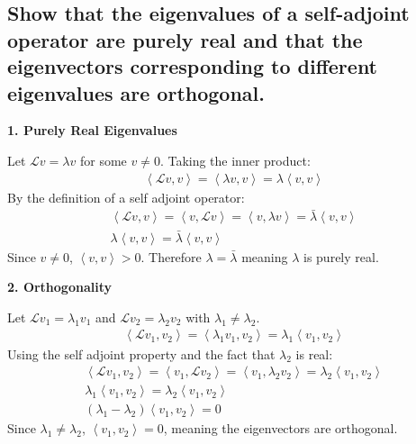 \documentclass[11pt]{article}
\begin{document}
    \subsection{Show that the eigenvalues of a self-adjoint operator are purely real and that the eigenvectors corresponding to different eigenvalues are orthogonal.}

    \textbf{1. Purely Real Eigenvalues}

    Let $\mathcal{L}v = \lambda v$ for some $v \neq 0$. Taking the inner product:
    \begin{gather*}
        \left<\mathcal{L}v,v\right> = \left<\lambda v,v\right> = \lambda \left<v,v\right>
    \end{gather*}
    By the definition of a self adjoint operator:
    \begin{gather*}
        \left<\mathcal{L}v,v\right> = \left<v,\mathcal{L}v\right> = \left<v,\lambda v\right> = \bar{\lambda} \left<v,v\right>\\
        \lambda \left<v,v\right> = \bar{\lambda} \left<v,v\right>
    \end{gather*}
    Since $v \neq 0$, $\left<v,v\right> > 0$. Therefore $\lambda = \bar{\lambda}$ meaning $\lambda$ is purely real.

    \textbf{2. Orthogonality}

    Let $\mathcal{L}v_1 = \lambda_1 v_1$ and $\mathcal{L}v_2 = \lambda_2 v_2$ with $\lambda_1 \neq \lambda_2$.
    \begin{gather*}
        \left<\mathcal{L}v_1,v_2\right> = \left<\lambda_1 v_1, v_2\right> = \lambda_1 \left<v_1, v_2\right>
    \end{gather*}
    Using the self adjoint property and the fact that $\lambda_2$ is real:
    \begin{gather*}
        \left<\mathcal{L}v_1,v_2\right> = \left<v_1,\mathcal{L}v_2\right> = \left<v_1,\lambda_2 v_2\right> = \lambda_2 \left<v_1, v_2\right>\\
        \lambda_1 \left<v_1, v_2\right> = \lambda_2 \left<v_1, v_2\right> \\
        (\lambda_1 - \lambda_2) \left<v_1, v_2\right> = 0
    \end{gather*}
    Since $\lambda_1 \neq \lambda_2$, $\left<v_1, v_2\right> = 0$, meaning the eigenvectors are orthogonal.
\end{document}
